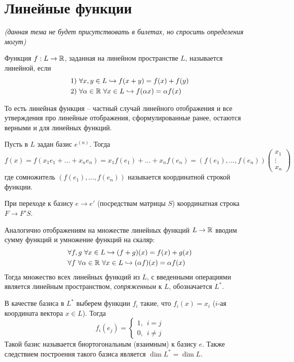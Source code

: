 \section{Линейные функции}
\textit{(данная тема не будет присутствовать в билетах, но спросить определения могут)}
\begin{definition}
    Функция $f:L\to \mathbb{R}$, заданная на линейном пространстве $L$, называется линейной, если
    \begin{align*}
    &1) \ \forall x, y \in L \hookrightarrow f(x+y)=f(x)+f(y) \\
    &2)\  \forall \alpha \in \mathbb{R} \ \forall x\in L \hookrightarrow f(\alpha x)=\alpha f(x)
    \end{align*}
\end{definition}
То есть линейная функция -- частный случай линейного отображения и все утверждения про линейные отображения, сформулированные ранее, остаются верными и для линейных функций.

Пусть в $L$ задан базис $e^{(n)}$. Тогда 
\[
f(x)=f(x_1e_1+\dots +x_ne_n)=x_1f(e_1)+\dots +x_nf(e_n)=(f(e_1), \dots, f(e_n))\begin{pmatrix} x_1 \\ \vdots \\ x_n \end{pmatrix}
\]
где сомножитель $(f(e_1), \dots, f(e_n))$ называется координатной строкой функции.

При переходе к базису $e\to e'$ (посредствам матрицы $S$) координатная строка $F\to F'S$.

Аналогично отображениям на множестве линейных функций $L\to \mathbb{R}$ вводим сумму функций и умножение функций на скаляр:
\begin{align*}
    &\forall f,g \ \forall x\in L \hookrightarrow(f+g)(x)=f(x)+g(x) \\
    &\forall f \ \forall \alpha\in \mathbb{R} \ \forall x\in L \hookrightarrow (\alpha f)(x)=\alpha f(x)
\end{align*}
Тогда множество всех линейных функций из $L$, с введенными операциями является линейным пространством, \textit{сопряженным} к $L$, обозначается $L^*$.

В качестве базиса в $L^*$ выберем функции $f_i$ такие, что $f_i(x)=x_i$ ($i$-ая координата вектора $x\in L$). Тогда $$f_i(e_j)=\begin{cases} 
   1, \ \ i=j \\
   0, \ \ i \neq j 
\end{cases}$$ Такой базис называется биортогональным (взаимным) к базису $e$.
Также следствием построения такого базиса является $\dim L^*=\dim L$.

